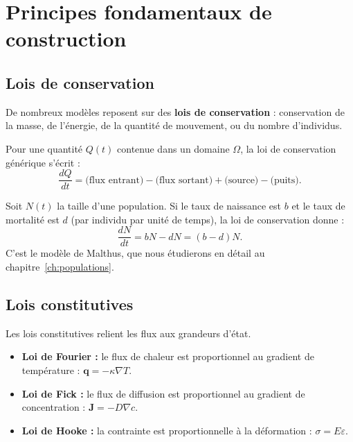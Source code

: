 \section{Principes fondamentaux de construction}
\label{sec:principes}

\subsection{Lois de conservation}

De nombreux mod\`eles reposent sur des \textbf{lois de conservation} :
conservation de la masse, de l'\'energie, de la quantit\'e de mouvement,
ou du nombre d'individus.

\begin{theoreme}
Pour une quantit\'e $Q(t)$ contenue dans un domaine $\Omega$, la loi
de conservation g\'en\'erique s'\'ecrit :
\[
  \frac{dQ}{dt} = \text{(flux entrant)} - \text{(flux sortant)}
                 + \text{(source)} - \text{(puits)}.
\]
\end{theoreme}

\begin{exemple}
Soit $N(t)$ la taille d'une population. Si le taux de naissance
est $b$ et le taux de mortalit\'e est $d$ (par individu par unit\'e
de temps), la loi de conservation donne :
\[
  \frac{dN}{dt} = bN - dN = (b-d)N.
\]
C'est le mod\`ele de Malthus, que nous \'etudierons en d\'etail au
chapitre~\ref{ch:populations}.
\end{exemple}

\subsection{Lois constitutives}

Les lois constitutives relient les flux aux grandeurs d'\'etat.

\begin{exemple}
\begin{itemize}
  \item \textbf{Loi de Fourier :} le flux de chaleur est proportionnel
    au gradient de temp\'erature : $\mathbf{q} = -\kappa\nabla T$.
  \item \textbf{Loi de Fick :} le flux de diffusion est proportionnel
    au gradient de concentration : $\mathbf{J} = -D\nabla c$.
  \item \textbf{Loi de Hooke :} la contrainte est proportionnelle
    \`a la d\'eformation : $\sigma = E\varepsilon$.
\end{itemize}
\end{exemple}


